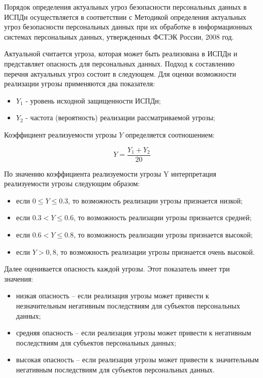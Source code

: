 Порядок определения актуальных угроз безопасности 
персональных данных в ИСПДн осуществляется 
в соответствии с Методикой определения 
актуальных угроз безопасности персональных данных 
при их обработке в информационных 
системах персональных данных, утвержденных 
ФСТЭК России, 2008 год.

Актуальной считается угроза, которая может быть 
реализована в ИСПДн и представляет опасность для 
персональных данных.  Подход к составлению перечня 
актуальных угроз состоит в следующем. 
Для оценки возможности реализации угрозы применяются два показателя: 

\begin{itemize}
    \item $Y_1$ - уровень исходной защищенности ИСПДн;
    \item $Y_2$ - частота (вероятность) реализации рассматриваемой угрозы;
\end{itemize}

Коэффициент реализуемости угрозы $Y$ определяется соотношением: 

\[Y = \frac{Y_1 + Y_2}{20}\]

По значению коэффициента реализуемости угрозы Y 
интерпретация реализуемости угрозы следующим образом: 
\begin{itemize}
    \item если $0 \leq Y \leq 0.3$, то возможность реализации угрозы признается низкой;
    \item если $0.3 < Y \leq  0.6$, то возможность реализации угрозы признается средней;
    \item если $0.6 < Y \leq  0.8$, то возможность реализации угрозы признается высокой;
    \item если $Y > 0,8$, то возможность реализации угрозы признается очень высокой.
\end{itemize}

Далее оценивается опасность каждой угрозы.
Этот показатель имеет три значения: 
\begin{itemize}
    \item низкая опасность – если реализация угрозы может привести к незначительным негативным последствиям для субъектов персональных данных;
    \item средняя опасность – если реализация угрозы может привести к негативным последствиям для субъектов персональных данных;
    \item высокая опасность – если реализация угрозы может привести к значительным негативным последствиям для субъектов персональных данных.
\end{itemize}

